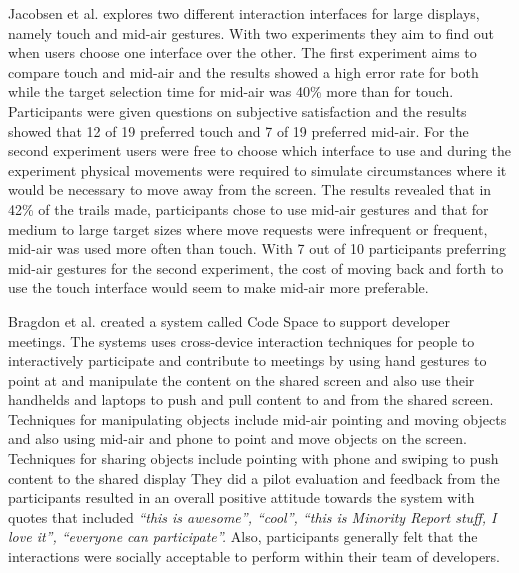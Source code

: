 Jacobsen et al. \cite{Jakobsen:2015} explores two different interaction interfaces for large displays, namely touch and mid-air gestures.
With two experiments they aim to find out when users choose one interface over the other.
The first experiment aims to compare touch and mid-air and the results showed a high error rate for both while the target selection time for mid-air was 40\% more than for touch.
Participants were given questions on subjective satisfaction and the results showed that 12 of 19 preferred touch and 7 of 19 preferred mid-air.
For the second experiment users were free to choose which interface to use and during the experiment physical movements were required to simulate circumstances where it would be necessary to move away from the screen.
The results revealed that in 42\% of the trails made, participants chose to use mid-air gestures and that for medium to large target sizes where move requests were infrequent or frequent, mid-air was used more often than touch.
With 7 out of 10 participants preferring mid-air gestures for the second experiment, the cost of moving back and forth to use the touch interface would seem to make mid-air more preferable.

Bragdon et al. \cite{Bragdon:2011} created a system called Code Space to support developer meetings.
The systems uses cross-device interaction techniques for people to interactively participate and contribute to meetings by using hand gestures to point at and manipulate the content on the shared screen and also use their handhelds and laptops to push and pull content to and from the shared screen.
Techniques for manipulating objects include mid-air pointing and moving objects and also using mid-air and phone to point and move objects on the screen.
Techniques for sharing objects include pointing with phone and swiping to push content to the shared display 
They did a pilot evaluation and feedback from the participants resulted in an overall positive attitude towards the system with quotes that included \textit{``this is awesome'', ``cool'', ``this is Minority Report stuff, I love it'', ``everyone can participate''.}
Also, participants generally felt that the interactions were socially acceptable to perform within their team of developers.

